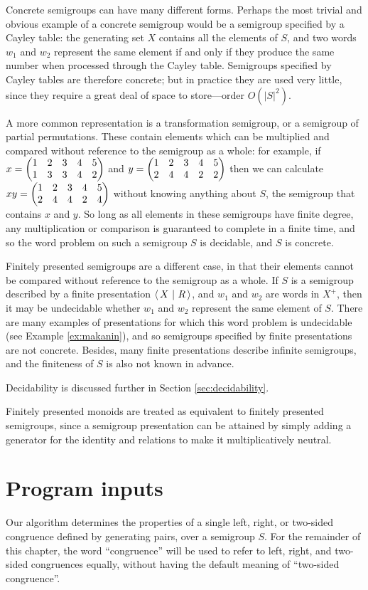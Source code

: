 Concrete semigroups can have many different forms.  Perhaps the most trivial and
obvious example of a concrete semigroup would be a semigroup specified by a
Cayley table: the generating set $X$ contains all the elements of $S$, and two
words $w_1$ and $w_2$ represent the same element if and only if they produce the
same number when processed through the Cayley table.  Semigroups specified by
Cayley tables are therefore concrete; but in practice they are used very little,
since they require a great deal of space to store---order $O(|S|^2)$.

A more common representation is a transformation semigroup, or a semigroup of
partial permutations.  These contain elements which can be multiplied and
compared without reference to the semigroup as a whole: for example, if
$x = \begin{pmatrix} 1 & 2 & 3 & 4 & 5 \\ 1 & 3 & 3 & 4 & 2 \end{pmatrix}$ and $y = \begin{pmatrix} 1 & 2 & 3 & 4 & 5 \\ 2 & 4 & 4 & 2 & 2 \end{pmatrix}$ then we can calculate
$xy = \begin{pmatrix} 1 & 2 & 3 & 4 & 5 \\ 2 & 4 & 4 & 2 & 4 \end{pmatrix}$ without knowing anything about $S$, the semigroup that
contains $x$ and $y$.  So long as all elements in these semigroups have finite
degree, any multiplication or comparison is guaranteed to complete in a finite
time, and so the word problem on such a semigroup $S$ is decidable, and $S$ is
concrete.

Finitely presented semigroups are a different case, in that their elements
cannot be compared without reference to the semigroup as a whole.  If $S$ is a
semigroup described by a finite presentation $\left\langle\,X ~\middle|~ R\,\right\rangle$, and $w_1$ and $w_2$
are words in $X^+$, then it may be undecidable whether $w_1$ and $w_2$ represent
the same element of $S$.  There are many examples of presentations for which
this word problem is undecidable (see Example \ref{ex:makanin}), and so
semigroups specified by finite presentations are not concrete.  Besides, many
finite presentations describe infinite semigroups, and the finiteness of $S$ is
also not known in advance.

Decidability is discussed further in Section \ref{sec:decidability}.

Finitely presented monoids are treated as equivalent to finitely presented
semigroups, since a semigroup presentation can be attained by simply adding a
generator for the identity and relations to make it multiplicatively neutral.

\section{Program inputs}
\label{sec:program-inputs}

Our algorithm determines the properties of a single left, right, or two-sided
congruence defined by generating pairs, over a semigroup $S$.
For the remainder of this chapter, the word ``congruence'' will be used to refer
to left, right, and two-sided congruences equally, without having the default
meaning of ``two-sided congruence''. %

